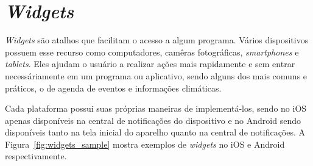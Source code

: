 \begin{comment}
\section{Acessibilidade} \label{subsubsec:acessibilidade}
Não se pode deixar de lado uma grande parcela da população que possui algum tipo de deficiência na hora de planejar novos sistemas e 
aplicativos. Cada plataforma possui seus próprios recursos para auxiliar pessoas com 
deficiência a utilizar os \textit{smartphones} e também possuem \textit{SDKs} que os desenvolvedores podem utilizar para deixar os 
aplicativos usáveis para todos. No iOS existem muitos recursos disponíveis como VoiceOver, 
Ditado e a própria Siri\footnote{\url{http://www.apple.com/br/accessibility/ios}}. No Android exite o TalkBack, BrailleBack e Acesso 
por voz\footnote{\url{https://support.google.com/accessibility/android}}. 

Importante ressaltar que os aplicativos aliados às tecnologias presentes nos \textit{smartphones} podem ajudar pessoas com deficiência 
a serem incluídas socialmente, a viverem melhor e até mesmo ajudar na reabilitação 
já que alguns aplicativos são usados para fisioterapia e aprendizado diferenciado como no caso de pessoas com autismo ou daltonismo.

https://github.com/phonegap/phonegap-mobile-accessibility
https://github.com/driftyco/ionic/issues/4100

\end{comment} 
 
\section{\textit{Widgets}} \label{subsubsec:widgets}
\textit{Widgets} são atalhos que facilitam o acesso a algum programa. Vários dispositivos possuem esse recurso como computadores, camêras fotográficas, \textit{smartphones} e \textit{tablets}. Eles ajudam o usuário a 
realizar ações mais rapidamente e sem entrar necessáriamente em um programa ou aplicativo, sendo alguns dos mais comuns e práticos, o de agenda de eventos e informações climáticas.

Cada plataforma possui suas próprias maneiras de implementá-los, sendo no iOS apenas disponíveis na central de notificações do dispositivo e no Android sendo disponíveis tanto na tela inicial do aparelho quanto na central 
de notificações. A Figura~\ref{fig:widgets_sample} mostra exemplos de \textit{widgets} no iOS e Android respectivamente.

